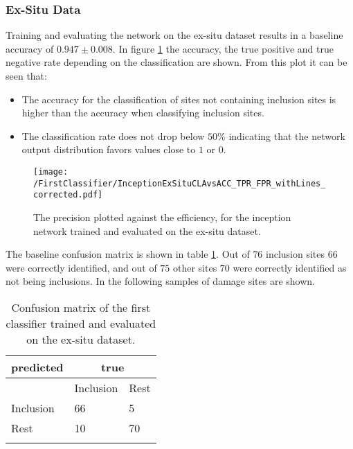 \subsubsection{Ex-Situ Data}
Training and evaluating the network on the ex-situ dataset results in a baseline accuracy of $0.947\pm 0.008$. In figure \ref{fig:InceptionExSituCLAvsACC} the accuracy, the true positive and true negative rate depending on the classification are shown. From this plot it can be seen that:
\begin{itemize}
\item The accuracy for the classification of sites not containing inclusion sites is higher than the accuracy when classifying inclusion sites. 
\item The classification rate does not drop below $50\%$ indicating that the network output distribution favors values close to $1$ or $0$.
\end{itemize}

\begin{figure}[H]
\texttt{[image: /FirstClassifier/InceptionExSituCLAvsACC\_TPR\_FPR\_withLines\_corrected.pdf]}
\caption{The precision plotted against the efficiency, for the inception network trained and evaluated on the ex-situ dataset.}
\label{fig:InceptionExSituCLAvsACC}
\end{figure}

The baseline confusion matrix is shown in table \ref{tab:FirstClassifierConfusionMatrixExSitu}. Out of $76$ inclusion sites $66$ were correctly identified, and out of $75$ other sites $70$ were correctly identified as not being inclusions. In the following samples of damage sites are shown. \\

\begin{table}
 \begin{center}
  \begin{tabular}{@{} *3l @{}} \toprule[2pt]
   predicted &  \multicolumn{2}{c}{true}  \\\midrule
    & Inclusion  & Rest   \\ 
   Inclusion  & 66 & 5 \\ 
   Rest  & 10 & 70 \\ \bottomrule[2pt]
   \label{tab:FirstClassifierConfusionMatrixExSitu}
  \end{tabular}
 \end{center}
 \caption{Confusion matrix of the first classifier trained and evaluated on the ex-situ dataset.}
 \label{tab:FirstClassifierConfusionMatrixExSitu}
\end{table}

